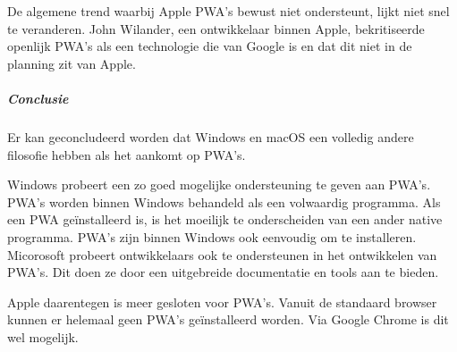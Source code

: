 		De algemene trend waarbij Apple PWA's bewust niet ondersteunt, lijkt niet snel te veranderen. John Wilander, een ontwikkelaar binnen Apple, bekritiseerde openlijk PWA's als een technologie die van Google is en dat dit niet in de planning zit van Apple. 
		\autocite{Wilander2019}
		
		
		\subparagraph{Conclusie}
		Er kan geconcludeerd worden dat Windows en macOS een volledig andere filosofie hebben als het aankomt op PWA's. 
		
		Windows probeert een zo goed mogelijke ondersteuning te geven aan PWA's. PWA's worden binnen Windows behandeld als een volwaardig programma. Als een PWA geïnstalleerd is, is het moeilijk te onderscheiden van een ander native programma.
		PWA's zijn binnen Windows ook eenvoudig om te installeren.
		Micorosoft probeert ontwikkelaars ook te ondersteunen in het ontwikkelen van PWA's. Dit doen ze door een uitgebreide documentatie en tools aan te bieden.
		
		Apple daarentegen is meer gesloten voor PWA's. Vanuit de standaard browser kunnen er helemaal geen PWA's geïnstalleerd worden. Via Google Chrome is dit wel mogelijk.
		